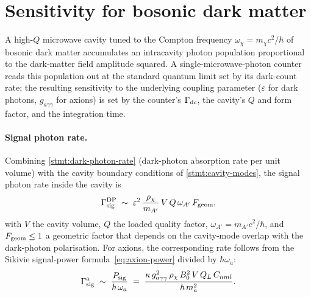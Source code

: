 \section{Sensitivity for bosonic dark matter}
\label{sec:cavity-sensitivity}

\begin{phenomenon}
A high-$Q$ microwave cavity tuned to the Compton frequency
$\omega_\chi=m_\chi c^2/\hbar$ of bosonic dark matter accumulates
an intracavity photon population proportional to the dark-matter
field amplitude squared. A single-microwave-photon counter
reads this population out at the standard quantum limit set by
its dark-count rate; the resulting sensitivity to the underlying
coupling parameter ($\varepsilon$ for dark photons,
$g_{a\gamma\gamma}$ for axions) is set by the
counter's $\Gamma_{\rm dc}$, the cavity's $Q$ and form factor,
and the integration time.
\end{phenomenon}

\paragraph{Signal photon rate.}
Combining \cref{stmt:dark-photon-rate} (dark-photon absorption
rate per unit volume) with the cavity boundary conditions of
\cref{stmt:cavity-modes}, the signal photon rate inside the
cavity is
\begin{equation}
\label{eq:cavity-signal-rate}
\Gamma_{\rm sig}^{\rm DP} \;\sim\;
\varepsilon^2\,\frac{\rho_\chi}{m_{A'}}\,
V\,Q\,\omega_{A'}\,F_{\rm geom},
\end{equation}
with $V$ the cavity volume, $Q$ the loaded quality factor,
$\omega_{A'}=m_{A'}c^2/\hbar$, and $F_{\rm geom}\leq 1$ a
geometric factor that depends on the cavity-mode overlap with
the dark-photon polarisation. For axions, the corresponding rate
follows from the Sikivie signal-power
formula~\cref{eq:axion-power} divided by $\hbar\omega_a$:
\begin{equation}
\label{eq:cavity-signal-rate-axion}
\Gamma_{\rm sig}^{\rm a} \;\sim\;
\frac{P_{\rm sig}}{\hbar\,\omega_a} \;=\;
\frac{\kappa\,g_{a\gamma\gamma}^2\,\rho_\chi\,B_0^2\,V\,Q_L\,C_{nml}}{\hbar\,m_a^2}.
\end{equation}

